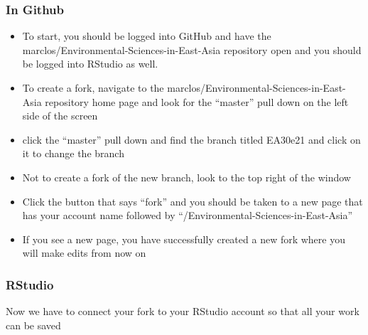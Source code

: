 \documentclass[12pt]{../SOP4_alpha}\usepackage[]{graphicx}\usepackage[]{xcolor}
\begin{document}
\subsubsection{In Github}
\begin{itemize}
\item To start, you should be logged into GitHub and have the marclos/Environmental-Sciences-in-East-Asia repository open and you should be logged into RStudio as well.

\item To create a fork, navigate to the marclos/Environmental-Sciences-in-East-Asia repository home page and look for the ``master'' pull down on the left side of the screen

\item click the ``master'' pull down and find the branch titled EA30e21 and click on it to change the branch

\item Not to create a fork of the new branch, look to the top right of the window

  \item Click the button that says ``fork'' and you should be taken to a new page that has your account name followed by ``/Environmental-Sciences-in-East-Asia''
  \item If you see a new page, you have successfully created a new fork where you will make edits from now on 
\end{itemize}


\subsubsection{RStudio}
Now we have to connect your fork to your RStudio account so that all your work can be saved 
\end{document}
